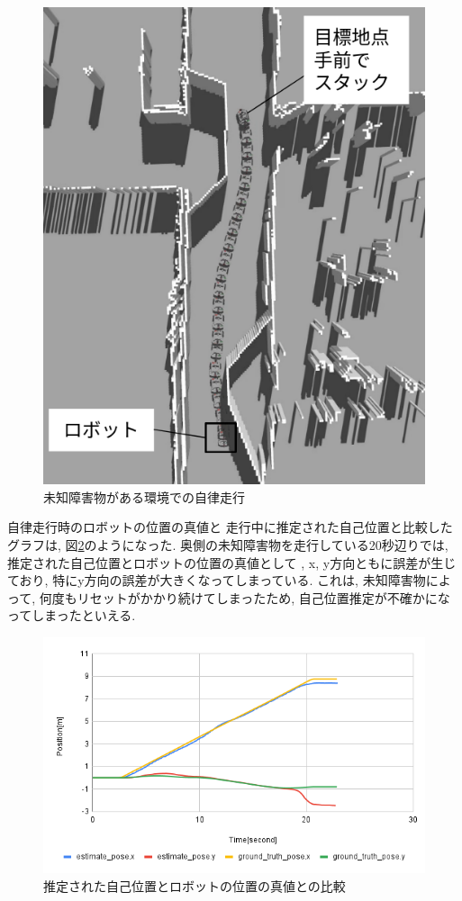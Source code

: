 \begin{figure}[H]
  \begin{center}
    \includegraphics[width=0.5\linewidth]{figs/no_implementation_with_reset.png}
    \caption{未知障害物がある環境での自律走行}
    \label{fig:nav_no_imp}
  \end{center}
\end{figure}

自律走行時のロボットの位置の真値と
走行中に推定された自己位置と比較したグラフは, 図\ref{fig:odom_comp_no_imp}のようになった. 
奥側の未知障害物を走行している20秒辺りでは, 推定された自己位置とロボットの位置の真値として
, x, y方向ともに誤差が生じており, 特にy方向の誤差が大きくなってしまっている. 
これは, 未知障害物によって, 何度もリセットがかかり続けてしまったため, 自己位置推定が不確かになってしまったといえる. 

\begin{figure}[H]
  \begin{center}
    \includegraphics[width=0.98\linewidth]{figs/sim_no_imp_ground_truth.png}
    \caption{推定された自己位置とロボットの位置の真値との比較}
    \label{fig:odom_comp_no_imp}
  \end{center}
\end{figure}

